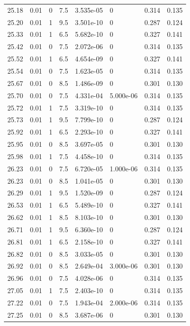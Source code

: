 \documentclass[preview]{standalone}
\begin{document}
{{{{{{{\begin{tabular}{L{1.2cm}C{1.2cm} C{0.3cm}C{0.5cm} C{1.4cm}C{1.4cm} C{1.4cm}C{1.4cm}}
  25.18  &  0.01  & 0     & 7.5 &  3.535e-05  & 0  & 0.314 &  0.135   \\ 
  25.20  &  0.01  & 1     & 9.5 &  3.501e-10  & 0  & 0.287 &  0.124   \\ 
  25.33  &  0.01  & 1     & 6.5 &  5.682e-10  & 0  & 0.327 &  0.141   \\ 
  25.42  &  0.01  & 0     & 7.5 &  2.072e-06  & 0  & 0.314 &  0.135   \\ 
  25.52  &  0.01  & 1     & 6.5 &  4.654e-09  & 0  & 0.327 &  0.141   \\ 
  25.54  &  0.01  & 0     & 7.5 &  1.623e-05  & 0  & 0.314 &  0.135   \\ 
  25.67  &  0.01  & 0     & 8.5 &  1.486e-09  & 0  & 0.301 &  0.130   \\ 
  25.70  &  0.01  & 0     & 7.5 &  4.331e-04  & 5.000e-06  & 0.314 &  0.135   \\ 
  25.72  &  0.01  & 1     & 7.5 &  3.319e-10  & 0  & 0.314 &  0.135   \\ 
  25.73  &  0.01  & 1     & 9.5 &  7.799e-10  & 0  & 0.287 &  0.124   \\ 
  25.92  &  0.01  & 1     & 6.5 &  2.293e-10  & 0  & 0.327 &  0.141   \\ 
  25.95  &  0.01  & 0     & 8.5 &  3.697e-05  & 0  & 0.301 &  0.130   \\ 
  25.98  &  0.01  & 1     & 7.5 &  4.458e-10  & 0  & 0.314 &  0.135   \\ 
  26.23  &  0.01  & 0     & 7.5 &  6.720e-05  & 1.000e-06  & 0.314 &  0.135   \\ 
  26.23  &  0.01  & 0     & 8.5 &  1.041e-05  & 0  & 0.301 &  0.130   \\ 
  26.29  &  0.01  & 1     & 9.5 &  1.520e-09  & 0  & 0.287 &  0.124   \\ 
  26.53  &  0.01  & 1     & 6.5 &  5.489e-10  & 0  & 0.327 &  0.141   \\ 
  26.62  &  0.01  & 1     & 8.5 &  8.103e-10  & 0  & 0.301 &  0.130   \\ 
  26.71  &  0.01  & 1     & 9.5 &  6.360e-10  & 0  & 0.287 &  0.124   \\ 
  26.81  &  0.01  & 1     & 6.5 &  2.158e-10  & 0  & 0.327 &  0.141   \\ 
  26.82  &  0.01  & 0     & 8.5 &  3.033e-05  & 0  & 0.301 &  0.130   \\ 
  26.92  &  0.01  & 0     & 8.5 &  2.649e-04  & 3.000e-06  & 0.301 &  0.130   \\ 
  26.96  &  0.01  & 0     & 7.5 &  4.028e-06  & 0  & 0.314 &  0.135   \\ 
  27.05  &  0.01  & 1     & 7.5 &  2.403e-10  & 0  & 0.314 &  0.135   \\ 
  27.22  &  0.01  & 0     & 7.5 &  1.943e-04  & 2.000e-06  & 0.314 &  0.135   \\ 
  27.25  &  0.01  & 0     & 8.5 &  3.687e-06  & 0  & 0.301 &  0.130   \\ 
\hline 
\end{tabular} 

}}}}}}}
\end{document}
